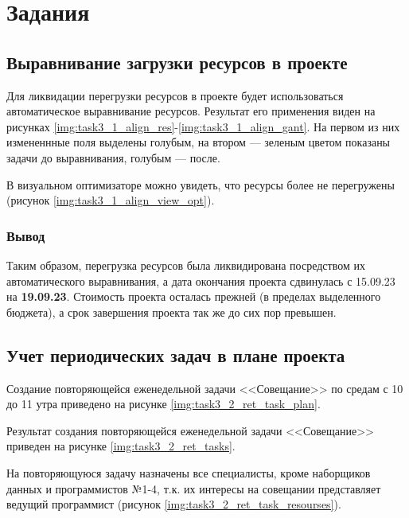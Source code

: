\chapter{Задания}

\section{Выравнивание загрузки ресурсов в проекте}

Для ликвидации перегрузки ресурсов в проекте будет использоваться автоматическое выравнивание ресурсов.
Результат его применения виден на рисунках \ref{img:task3_1_align_res}-\ref{img:task3_1_align_gant}. На первом из них измененнные поля выделены голубым, на втором --- зеленым цветом показаны задачи до выравнивания, голубым --- после. 

В визуальном оптимизаторе можно увидеть, что ресурсы более не перегружены (рисунок \ref{img:task3_1_align_view_opt}).

\subsection*{Вывод}
Таким образом, перегрузка ресурсов была ликвидирована посредством их автоматического выравнивания, а дата окончания проекта сдвинулась с 15.09.23 на \textbf{19.09.23}. Стоимость проекта осталась прежней (в пределах выделенного бюджета), а срок завершения проекта так же до сих пор превышен.

\section{Учет периодических задач в плане проекта}

Создание повторяющейся еженедельной задачи <<Совещание>> по 
средам с 10 до 11 утра приведено на рисунке \ref{img:task3_2_ret_task_plan}.

Результат создания повторяющейся еженедельной задачи <<Совещание>> приведен на рисунке \ref{img:task3_2_ret_tasks}.

На повторяющуюся задачу назначены все  специалисты, кроме 
наборщиков данных и программистов №1-4, т.к. их интересы на совещании 
представляет ведущий программист (рисунок \ref{img:task3_2_ret_task_resourses}).


